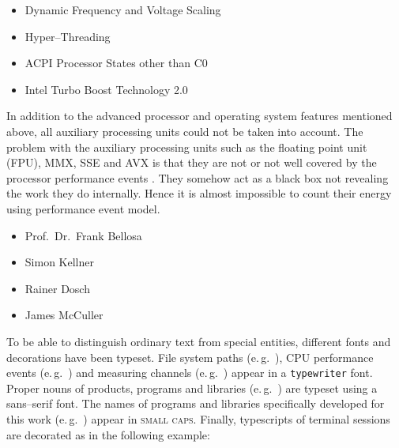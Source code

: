 \begin{itemize}

\item Dynamic Frequency and Voltage Scaling \cite{DVFS}

\item Hyper--Threading \cite{HT}

\item ACPI Processor States other than C0 \cite{ACPI}

\item Intel\TReg{} Turbo Boost Technology 2.0 \cite{IntelTurboBoost}

\end{itemize}

In addition to the advanced processor and operating system features mentioned
above, all auxiliary processing units could not be taken into account. The
problem with the auxiliary processing units such as the floating point unit
(FPU), MMX\cite{wiki:MMX}, SSE\cite{wiki:SSE} and AVX\cite{AVX} is that
they are not or not well covered by the processor performance events
\cite{intel2011events}. They somehow act as a black box not revealing the
work they do internally. Hence it is almost impossible to count their energy
using performance event model.


\begin{itemize}

\item Prof.\ Dr.\ Frank Bellosa

\item Simon Kellner

\item Rainer Dosch

\item James McCuller

\end{itemize}


\label{sec:preliminaries}

To be able to distinguish ordinary text from special entities, different fonts
and decorations have been typeset. File system paths (e.\,g.\ ),
CPU performance events (e.\,g.\ \JWctrCLK{}) and measuring channels (e.\,g.\ 
) appear in a \texttt{typewriter} font. Proper nouns of
products, programs and libraries (e.\,g.\ \JWTleaps{}) are typeset using a
\textsf{sans--serif} font. The names of programs and libraries specifically
developed for this work (e.\,g.\ \JWTdd{}) appear in \textsc{small caps}.
Finally, typescripts of terminal sessions are decorated as in the following
example:

